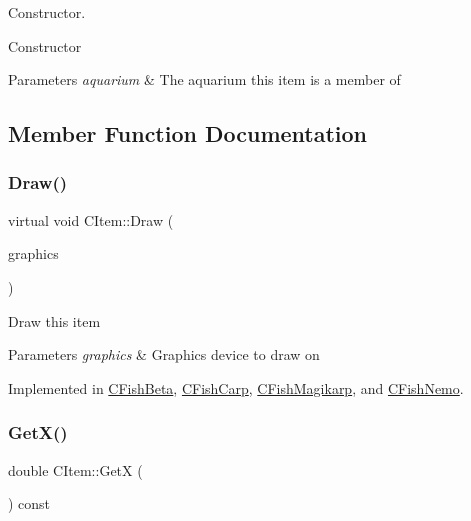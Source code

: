 Constructor. 

Constructor 
\begin{DoxyParams}{Parameters}
{\em aquarium} & The aquarium this item is a member of \\
\hline
\end{DoxyParams}


\subsection{Member Function Documentation}
\mbox{\label{class_c_item_a7ef8448d0c4bc53d0f1943a4dc817f6f}} 
\subsubsection{\texorpdfstring{Draw()}{Draw()}}
{\footnotesize\ttfamily virtual void C\+Item\+::\+Draw (\begin{DoxyParamCaption}\item[{Gdiplus\+::\+Graphics $\ast$}]{graphics }\end{DoxyParamCaption})\hspace{0.3cm}{\ttfamily [pure virtual]}}

Draw this item 
\begin{DoxyParams}{Parameters}
{\em graphics} & Graphics device to draw on \\
\hline
\end{DoxyParams}


Implemented in \hyperlink{class_c_fish_beta_ae2effbff7b98bb3cd6e1070d61d5366e}{C\+Fish\+Beta}, \hyperlink{class_c_fish_carp_af0c967b07054d90f7b5c2fbfff9e95fb}{C\+Fish\+Carp}, \hyperlink{class_c_fish_magikarp_acb88cf3659f4cebd4784e7039b541c33}{C\+Fish\+Magikarp}, and \hyperlink{class_c_fish_nemo_a56389067cff39be91a796f42529458d3}{C\+Fish\+Nemo}.

\mbox{\label{class_c_item_a394d38a058fc53f0e958ca52248560c8}} 
\subsubsection{\texorpdfstring{Get\+X()}{GetX()}}
{\footnotesize\ttfamily double C\+Item\+::\+GetX (\begin{DoxyParamCaption}{ }\end{DoxyParamCaption}) const\hspace{0.3cm}{\ttfamily [inline]}}

